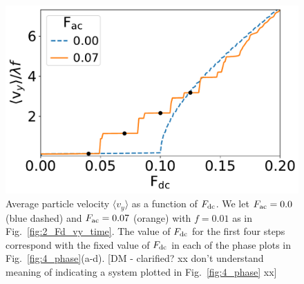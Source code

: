 \documentclass[preprint,showpacs,preprintnumbers,amsmath,amssymb,aps,prb]{revtex4-1}
\theoremstyle{remark}
\begin{document}
\begin{figure}[h]
\centering
\includegraphics[width=\columnwidth]{fig3_sweep_vyFDC.pdf}
\caption{Average particle velocity  $\langle v_{y} \rangle$
  as a function of $F_{\rm dc}$.
  We let
  $F_{\rm ac}=0.0$ (blue dashed) and 
  $F_{\rm ac}=0.07$ (orange) with $f = 0.01$ 
  as in Fig.~\ref{fig:2_Fd_vy_time}.
  The value of $F_{\rm dc}$ for the first four steps
  correspond with the fixed value of $F_{\rm dc}$
  in each of the phase plots
  in Fig.~\ref{fig:4_phase}(a-d).
  [DM - clarified?  xx don't understand meaning of indicating a system
  plotted in Fig.~\ref{fig:4_phase} xx]
}
\label{fig:3_sweep_vyFDC}
\end{figure}
\end{document}
